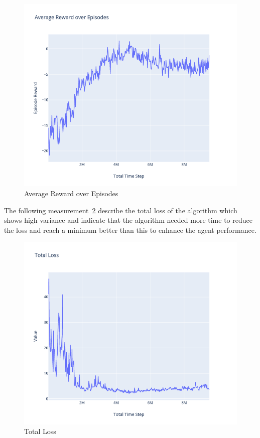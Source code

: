 \begin{figure}[H]
	\centering
	\includegraphics[width=\linewidth]{figures/exps/1st_exp/avg_eps_reward}
	\caption{Average Reward over Episodes}
	\label{fig:1st_exp_avg_eps_reward}
\end{figure}
The following measurement~\ref{fig:1st_exp_total_loss} describe the total loss of the algorithm which shows high variance and indicate that the algorithm needed more time to reduce the loss and reach a minimum better than this to enhance the agent performance.
\begin{figure}[H]
	\centering
	\includegraphics[width=\linewidth]{figures/exps/1st_exp/total_loss}
	\caption{Total Loss}
	\label{fig:1st_exp_total_loss}
\end{figure}
